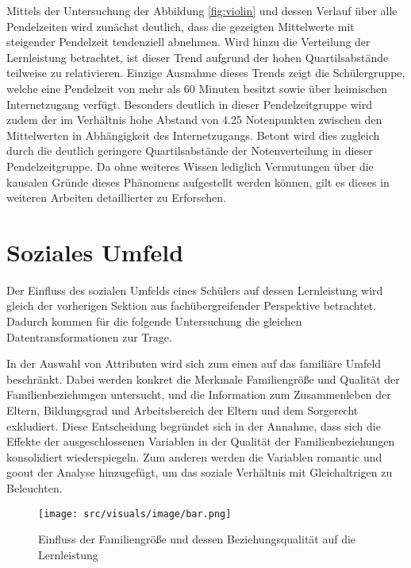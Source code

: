 Mittels der Untersuchung der Abbildung \ref{fig:violin} und dessen Verlauf über alle Pendelzeiten wird zunächst deutlich, dass die gezeigten Mittelwerte mit steigender Pendelzeit tendenziell abnehmen. 
Wird hinzu die Verteilung der Lernleistung betrachtet, ist dieser Trend aufgrund der hohen Quartilsabstände teilweise zu relativieren.
Einzige Ausnahme dieses Trends zeigt die Schülergruppe, welche eine Pendelzeit von mehr als 60 Minuten besitzt sowie über heimischen Internetzugang verfügt.
Besonders deutlich in dieser Pendelzeitgruppe wird zudem der im Verhältnis hohe Abstand von 4.25 Notenpunkten zwischen den Mittelwerten in Abhängigkeit des Internetzugangs.
Betont wird dies zugleich durch die deutlich geringere Quartilsabstände der Notenverteilung in dieser Pendelzeitgruppe.
Da ohne weiteres Wissen lediglich Vermutungen über die kausalen Gründe dieses Phänomens aufgestellt werden können, gilt es dieses in weiteren Arbeiten detaillierter zu Erforschen.


\section{Soziales Umfeld}

Der Einfluss des sozialen Umfelds eines Schülers auf dessen Lernleistung wird gleich der vorherigen Sektion aus fachübergreifender Perspektive betrachtet.
Dadurch kommen für die folgende Untersuchung die gleichen Datentransformationen zur Trage.

In der Auswahl von Attributen wird sich zum einen auf das familiäre Umfeld beschränkt. 
Dabei werden konkret die Merkmale Familiengröße und Qualität der Familienbeziehungen untersucht, und die Information zum Zusammenleben der Eltern, Bildungsgrad und Arbeitsbereich der Eltern und dem Sorgerecht exkludiert.
Diese Entscheidung begründet sich in der Annahme, dass sich die Effekte der ausgeschlossenen Variablen in der Qualität der Familienbeziehungen konsolidiert wiederspiegeln.
Zum anderen werden die Variablen romantic und goout der Analyse hinzugefügt, um das soziale Verhältnis mit Gleichaltrigen zu Beleuchten.

\begin{figure}[htb]
    \centering
    \texttt{[image: src/visuals/image/bar.png]}
    \caption{Einfluss der Familiengröße und dessen Beziehungsqualität auf die Lernleistung}
    \label{fig:bar}
\end{figure}

